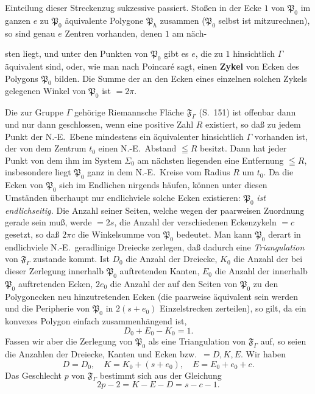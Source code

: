 \documentclass{article}
\begin{document}
Einteilung dieser Streckenzug sukzessive passiert. Stoßen in der Ecke $1$ von $\mathfrak{P}_0$ im ganzen $e$ zu $\mathfrak{P}_0$ äquivalente Polygone $\mathfrak{P}_h$ zusammen ($\mathfrak{P}_0$ selbst ist mitzurechnen), so sind genau $e$ Zentren vorhanden, denen $1$ am näch-

sten liegt, und unter den Punkten von $\mathfrak{P}_0$ gibt es $e$, die zu $1$ hinsichtlich $\varGamma$ äquivalent sind, oder, wie man nach Poincaré sagt, einen \textbf{Zykel} von Ecken des Polygons $\mathfrak{P}_0$ bilden. Die Summe der an den Ecken eines einzelnen solchen Zykels gelegenen Winkel von $\mathfrak{P}_0$ ist $= 2\pi$.

Die zur Gruppe $\varGamma$ gehörige Riemannsche Fläche $\mathfrak{F}_\varGamma$ (S.~151) ist offenbar dann und nur dann geschlossen, wenn eine positive Zahl $R$ existiert, so daß zu jedem Punkt der N.-E.\ Ebene mindestens ein äquivalenter hinsichtlich $\varGamma$ vorhanden ist, der von dem Zentrum $t_0$ einen N.-E.\ Abstand $\leqq R$ besitzt. Dann hat jeder Punkt von dem ihm im System $\Sigma_0$ am nächsten liegenden eine Entfernung $\leqq R$, insbesondere liegt $\mathfrak{P}_0$ ganz in dem N.-E.\ Kreise vom Radius $R$ um $t_0$. Da die Ecken von $\mathfrak{P}_0$ sich im Endlichen nirgends häufen, können unter diesen Umständen überhaupt nur endlichviele solche Ecken existieren: $\mathfrak{P}_0$ \emph{ist endlichseitig.} Die Anzahl seiner Seiten, welche wegen der paarweisen Zuordnung gerade sein muß, werde $= 2s$, die Anzahl der verschiedenen Eckenzykeln $= c$ gesetzt, so daß $2\pi c$ die Winkelsumme von $\mathfrak{P}_0$ bedeutet. Man kann $\mathfrak{P}_0$ derart in endlichviele N.-E.\ geradlinige Dreiecke zerlegen, daß dadurch eine \emph{Triangulation} von $\mathfrak{F}_\varGamma$ zustande kommt. Ist $D_0$ die Anzahl der Dreiecke, $K_0$ die Anzahl der bei dieser Zerlegung innerhalb $\mathfrak{P}_0$ auftretenden Kanten, $E_0$ die Anzahl der innerhalb $\mathfrak{P}_0$ auftretenden Ecken, $2e_0$ die Anzahl der auf den Seiten von $\mathfrak{P}_0$ zu den Polygonecken neu hinzutretenden Ecken (die paarweise äquivalent sein werden und die Peripherie von $\mathfrak{P}_0$ in $2(s + e_0)$ Einzelstrecken zerteilen), so gilt, da ein konvexes Polygon einfach zusammenhängend ist,
\[ D_0 + E_0 - K_0 = 1. \]
Fassen wir aber die Zerlegung von $\mathfrak{P}_0$ als eine Triangulation von $\mathfrak{F}_\varGamma$ auf, so seien die Anzahlen der Dreiecke, Kanten und Ecken bzw.\ $= D, K, E$. Wir haben
\[ D = D_0, \quad K = K_0 + (s + e_0), \quad E = E_0 + e_0 + c. \]
Das Geschlecht $p$ von $\mathfrak{F}_\varGamma$ bestimmt sich aus der Gleichung
\[ 2p - 2 = K - E - D = s - c - 1. \]
\end{document}
